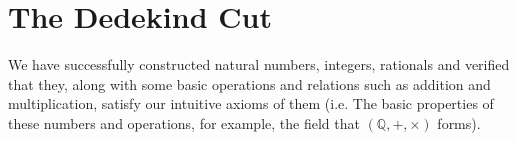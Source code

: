 \section{The Dedekind Cut}
We have successfully constructed natural numbers, integers, rationals and verified that they, along with some 
basic operations and relations such as addition and multiplication, satisfy our intuitive axioms of them (i.e. 
The basic properties of these numbers and operations, for example, the field that $(\mathbb{Q},+,\times)$ forms). 